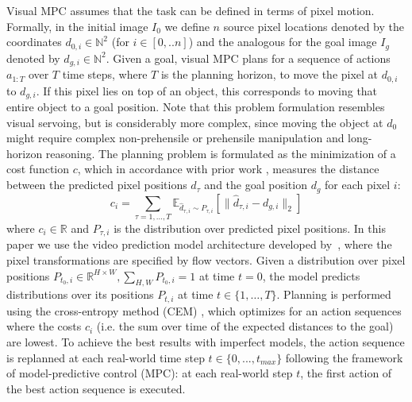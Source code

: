 Visual MPC assumes that the task can be defined in terms of pixel motion. Formally, in the initial image $I_0$ we define $n$ source pixel locations denoted by the coordinates $d_{0,i} \in \mathbb{N}^2$ (for $i \in [0,..n]$) and the analogous for the goal image $I_g$ denoted by $d_{g,i} \in \mathbb{N}^2$. Given a goal, visual MPC plans for a sequence of actions $a_{1:T}$ over $T$ time steps, where $T$ is the planning horizon,
to move the pixel at $d_{0,i}$ to $d_{g,i}$. If this pixel lies on top of an object, this corresponds to moving that entire object to a goal position. Note that this problem formulation resembles visual servoing, but is considerably more complex, since moving the object at $d_0$ might require complex non-prehensile or prehensile manipulation and long-horizon reasoning.
The planning problem is formulated as the minimization of a cost function $c$, which in accordance with prior work \cite{sna}, measures the distance between the predicted pixel positions $\hat{d}_{\tau}$ and the goal position $d_g$ for each pixel $i$:
\begin{equation}
c_i  = \sum_{\tau = 1, \dots, T} \mathbb{E}_{\hat{d}_{\tau,i} \sim P_{\tau,i}} \left[\|\hat{d}_{\tau,i} - d_{g,i}\|_2\right]  
\label{eq:cost}
\end{equation}
where $c_i \in \mathbb{R}$ and $P_{\tau,i}$ is the distribution over predicted pixel positions. In this paper we use the video prediction model architecture developed by~\citet{savp}, where the pixel transformations are specified by flow vectors.
Given a distribution over pixel positions \mbox{$P_{t_0,i}\in\mathbb{R}^{H\times W}, \sum_{H,W} P_{t_0,i} = 1$} at time $t = 0$, the model predicts distributions over its positions $P_{t,i}$ at time $t \in \{ 1, \dots, T \}$. Planning is performed using the cross-entropy method (CEM) \cite{cem-rk-13}, which optimizes for an action sequences where the costs $c_i$ (i.e. the sum over time of the expected distances to the goal) are lowest.
To achieve the best results with imperfect models, the action sequence is replanned at each real-world time step $t \in \{0,...,t_{max}\}$ following the framework of model-predictive control (MPC): at each real-world step $t$, the first action of the best action sequence is executed. 
